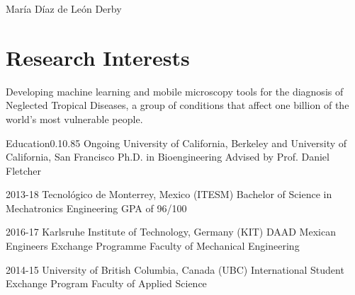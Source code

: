\documentclass{federico_cv}
\begin{document}
\contact
{María Díaz de León Derby}
{} %
{} %



\section{Research Interests}
Developing machine learning and mobile microscopy tools for the diagnosis of Neglected Tropical Diseases, a group of conditions that affect one billion of the world's most vulnerable people.


\begin{tblSection}{Education}{0.1}{0.85}
\degree
{Ongoing}
{University of California, Berkeley and University of California, San Francisco}
{Ph.D. in Bioengineering}
{Advised by Prof. Daniel Fletcher}

\degree
{2013-18}
{Tecnológico de Monterrey, Mexico (ITESM)}
{Bachelor of Science in Mechatronics Engineering}
{GPA of 96/100}

\degree
{2016-17}
{Karlsruhe Institute of Technology, Germany (KIT)}
{DAAD Mexican Engineers Exchange Programme}
{Faculty of Mechanical Engineering}

\degree
{2014-15}
{University of British Columbia, Canada (UBC)}
{International Student Exchange Program}
{Faculty of Applied Science}

\end{tblSection}
\end{document}
